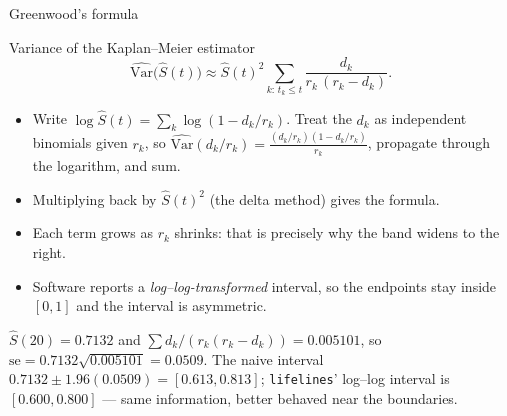 \documentclass[aspectratio=169,11pt]{beamer}
\begin{document}
\begin{frame}{Greenwood's formula}
  \scriptsize
  \begin{block}{Variance of the Kaplan--Meier estimator}
    \[
      \widehat{\mathrm{Var}}\bigl(\hat S(t)\bigr)
        \approx \hat S(t)^2 \sum_{k:\,t_k\le t}\frac{d_k}{r_k\,(r_k-d_k)} .
    \]
  \end{block}
  \begin{readme}
    \begin{itemize}
      \item Write $\log\hat S(t)=\sum_k \log(1-d_k/r_k)$. Treat the $d_k$ as independent
            binomials given $r_k$, so $\widehat{\mathrm{Var}}(d_k/r_k)=
            \frac{(d_k/r_k)(1-d_k/r_k)}{r_k}$, propagate through the logarithm, and sum.
      \item Multiplying back by $\hat S(t)^2$ (the delta method) gives the formula.
      \item Each term grows as $r_k$ shrinks: that is precisely why the band widens to
            the right.
      \item Software reports a \emph{log--log-transformed} interval, so the endpoints stay
            inside $[0,1]$ and the interval is asymmetric.
    \end{itemize}
  \end{readme}
  \begin{numexample}
    $\hat S(20)=0.7132$ and $\sum d_k/(r_k(r_k-d_k))=0.005101$, so
    $\mathrm{se}=0.7132\sqrt{0.005101}=0.0509$. The naive interval
    $0.7132\pm1.96(0.0509)=[0.613,0.813]$; \texttt{lifelines}' log--log interval is
    $[0.600,0.800]$ --- same information, better behaved near the boundaries.
  \end{numexample}
\end{frame}
\end{document}
